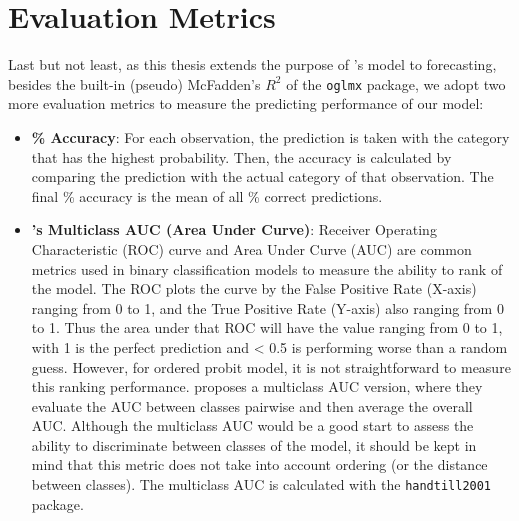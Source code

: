 \section{Evaluation Metrics}

Last but not least, as this thesis extends the purpose of \citet{hausman1992}'s model to forecasting, besides the built-in (pseudo) McFadden's $R^2$ of the \verb|oglmx| package, we adopt two more evaluation metrics to measure the predicting performance of our model:
\begin{itemize}
    \item \textbf{\% Accuracy}: For each observation, the prediction is taken with the category that has the highest probability. Then, the accuracy is calculated by comparing the prediction with the actual category of that observation. The final \% accuracy is the mean of all \% correct predictions.

    \item \textbf{\citet{handtill2001}'s Multiclass AUC (Area Under Curve)}: Receiver Operating Characteristic (ROC) curve and Area Under Curve (AUC) are common metrics used in binary classification models to measure the ability to rank of the model. The ROC plots the curve by the False Positive Rate (X-axis) ranging from 0 to 1, and the True Positive Rate (Y-axis) also ranging from 0 to 1. Thus the area under that ROC will have the value ranging from 0 to 1, with 1 is the perfect prediction and < 0.5 is performing worse than a random guess. However, for ordered probit model, it is not straightforward to measure this ranking performance. \citet{handtill2001} proposes a multiclass AUC version, where they evaluate the AUC between classes pairwise and then average the overall AUC. Although the multiclass AUC would be a good start to assess the ability to discriminate between classes of the model, it should be kept in mind that this metric does not take into account ordering (or the distance between classes). The multiclass AUC is calculated with the \verb|handtill2001| package.
\end{itemize}





